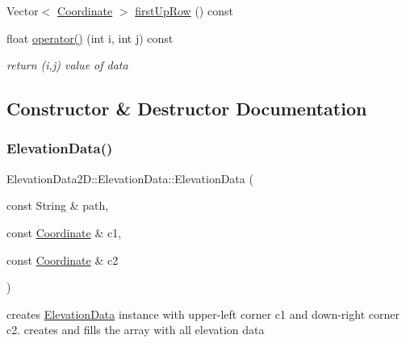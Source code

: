 \begin{DoxyCompactItemize}
\item 
Vector$<$ \mbox{\hyperlink{classElevationData2D_1_1Coordinate}{Coordinate}} $>$ \mbox{\hyperlink{classElevationData2D_1_1ElevationData_a055c65b9f64c58e4fd37e48c36c69f6c}{first\+Up\+Row}} () const
\item 
\mbox{\label{classElevationData2D_1_1ElevationData_a0a150c24ae9f155260cc1d89be4ab8db}} 
float \mbox{\hyperlink{classElevationData2D_1_1ElevationData_a0a150c24ae9f155260cc1d89be4ab8db}{operator()}} (int i, int j) const
\begin{DoxyCompactList}\small\item\em return (i,j) value of data \end{DoxyCompactList}\end{DoxyCompactItemize}


\subsection{Constructor \& Destructor Documentation}
\mbox{\label{classElevationData2D_1_1ElevationData_ab6c477c8515de15f43e844c701c88f5b}} 
\subsubsection{\texorpdfstring{Elevation\+Data()}{ElevationData()}}
{\footnotesize\ttfamily Elevation\+Data2\+D\+::\+Elevation\+Data\+::\+Elevation\+Data (\begin{DoxyParamCaption}\item[{const String \&}]{path,  }\item[{const \mbox{\hyperlink{classElevationData2D_1_1Coordinate}{Coordinate}} \&}]{c1,  }\item[{const \mbox{\hyperlink{classElevationData2D_1_1Coordinate}{Coordinate}} \&}]{c2 }\end{DoxyParamCaption})}

creates \mbox{\hyperlink{classElevationData2D_1_1ElevationData}{Elevation\+Data}} instance with upper-\/left corner c1 and down-\/right corner c2. creates and fills the array with all elevation data 

